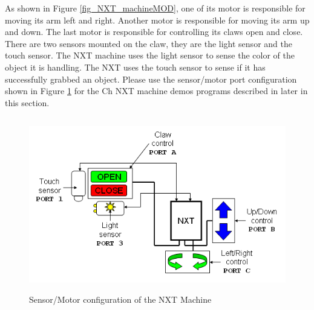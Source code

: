 \documentclass[12pt]{article}
\begin{document}
\noindent
As shown in Figure \ref{fig_NXT_machineMOD}, one of its motor is responsible for moving its arm left and right.
Another motor is responsible for moving its arm up and down.
The last motor is responsible for controlling its claws open and close.
There are two sensors mounted on the claw, they are the light sensor and the touch sensor.
The NXT machine uses the light sensor to sense the color of the object it is handling.
The NXT uses the touch sensor to sense if it has successfully grabbed an object.
Please use the sensor/motor port configuration shown in Figure \ref{fig_NXT_mach_port} for the
    Ch NXT machine demos programs described in later in this section.
\begin{figure}[h]
  \begin{center}
    \includegraphics[height=3in]{figure/mindstorm/NXT_mach_port.png}
    \caption{Sensor/Motor configuration of the NXT Machine\label{fig_NXT_mach_port}}
  \end{center}
\end{figure}
\newpage
\end{document}
